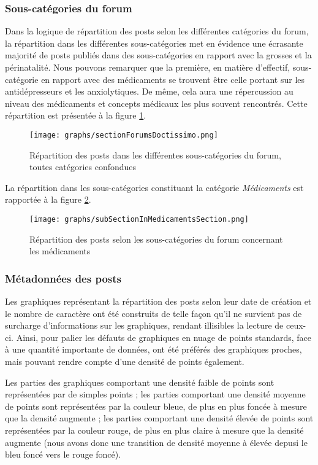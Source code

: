 \documentclass[a4paper, 12pt, openany, oneside, abstract=on]{article} %
\begin{document}
\subsubsection{Sous-catégories du forum}
Dans la logique de répartition des posts selon les différentes catégories du forum, la répartition dans les différentes sous-catégories met en évidence une écrasante majorité de posts publiés dans des sous-catégories en rapport avec la grosses et la périnatalité. Nous pouvons remarquer que la première, en matière d'effectif, sous-catégorie en rapport avec des médicaments se trouvent être celle portant sur les antidépresseurs et les anxiolytiques. De même, cela aura une répercussion au niveau des médicaments et concepts médicaux les plus souvent rencontrés. Cette répartition est présentée à la figure \ref{fig:EffCtgGrossForum}.
\begin{figure}[H]
    \centering
    \texttt{[image: graphs/sectionForumsDoctissimo.png]}
    \caption{\label{fig:EffCtgGrossForum}Répartition des posts dans les différentes sous-catégories du forum, toutes catégories confondues} 
\end{figure}

La répartition dans les sous-catégories constituant la catégorie \emph{Médicaments} est rapportée à la figure \ref{fig:mostFrqDrg}.
\begin{figure}[H]
    \centering
    \texttt{[image: graphs/subSectionInMedicamentsSection.png]}
    \caption{\label{fig:mostFrqDrg}Répartition des posts selon les sous-catégories du forum concernant les médicaments}
\end{figure}

\subsubsection{Métadonnées des posts}
Les graphiques représentant la répartition des posts selon leur date de création et le nombre de caractère ont été construits de telle façon qu'il ne survient pas de surcharge d'informations sur les graphiques, rendant illisibles la lecture de ceux-ci. Ainsi, pour palier les défauts de graphiques en nuage de points \og{}standards\fg{}, face à une quantité importante de données, ont été préférés des graphiques proches, mais pouvant rendre compte d'une densité de points également.

Les parties des graphiques comportant une densité faible de points sont représentées par de simples points ; les parties comportant une densité moyenne de points sont représentées par la couleur bleue, de plus en plus foncée à mesure que la densité augmente ; les parties comportant une densité élevée de points sont représentées par la couleur rouge, de plus en plus claire à mesure que la densité augmente (nous avons donc une transition de densité moyenne à élevée depusi le bleu foncé vers le rouge foncé).
\end{document}
